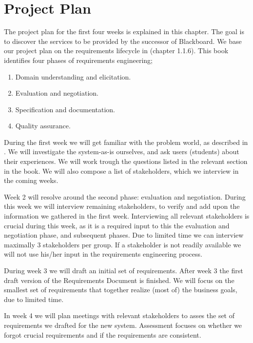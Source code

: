 \chapter{Project Plan}
The project plan for the first four weeks is explained in this chapter. The goal is to discover the services to be provided by the successor of Blackboard. We base our project plan on the requirements lifecycle in \cite{RE_book} (chapter 1.1.6). This book identifies four phases of requirements engineering; 
\begin{enumerate}
	\item Domain understanding and elicitation.
	\item Evaluation and negotiation.
	\item Specification and documentation.
	\item Quality assurance.
\end{enumerate}

During the first week we will get familiar with the problem world, as described in \cite{RE_book}. We will investigate the system-as-is ourselves, and ask users (students) about their experiences. We will work trough the questions listed in the relevant section in the book. We will also compose a list of stakeholders, which we interview in the coming weeks.

Week 2 will resolve around the second phase: evaluation and negotiation. During this week we will interview remaining stakeholders, to verify and add upon the information we gathered in the first week. Interviewing all relevant stakeholders is crucial during this week, as it is a required input to this the evaluation and negotiation phase, and subsequent phases. Due to limited time we can interview maximally 3 stakeholders per group. If a stakeholder is not readily available we will not use his/her input in the requirements engineering process. 

During week 3 we will draft an initial set of requirements. After week 3 the first draft version of the Requirements Document is finished. We will focus on the smallest set of requirements that together realize (most of) the business goals, due to limited time. 

In week 4 we will plan meetings with relevant stakeholders to asses the set of requirements we drafted for the new system. Assessment focuses on whether we forgot crucial requirements and if the requirements are consistent.  

